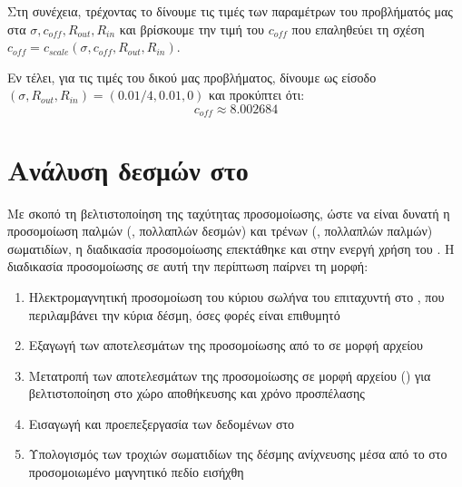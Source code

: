 Στη συνέχεια, τρέχοντας το   δίνουμε τις τιμές των παραμέτρων του προβλήματός μας στα $\sigma, c_{off}, R_{out}, R_{in}$ και βρίσκουμε την τιμή του $c_{off}$ που επαληθεύει τη σχέση $c_{off} = c_{scale} \left(\sigma, c_{off}, R_{out}, R_{in} \right)$.





Εν τέλει, για τις τιμές του δικού μας προβλήματος, δίνουμε ως είσοδο $\left(\sigma, R_{out}, R_{in} \right) = \left(0.01/4,0.01, 0 \right)$ και προκύπτει ότι:
\begin{equation}
c_{off} \approx 8.002684
\end{equation}

\section{Ανάλυση δεσμών στο }

Με σκοπό τη βελτιστοποίηση της ταχύτητας προσομοίωσης, ώστε να είναι δυνατή η προσομοίωση παλμών (, πολλαπλών δεσμών) και τρένων (, πολλαπλών παλμών) σωματιδίων, η διαδικασία προσομοίωσης επεκτάθηκε και στην ενεργή χρήση του .
Η διαδικασία προσομοίωσης σε αυτή την περίπτωση παίρνει τη μορφή:
\begin{enumerate}
\item Ηλεκτρομαγνητική προσομοίωση του κύριου σωλήνα του επιταχυντή στο , που περιλαμβάνει την κύρια δέσμη, όσες φορές είναι επιθυμητό
\item Εξαγωγή των αποτελεσμάτων της προσομοίωσης από το  σε μορφή αρχείου 
\item Μετατροπή των αποτελεσμάτων της προσομοίωσης σε μορφή αρχείου  () για βελτιστοποίηση στο χώρο αποθήκευσης και χρόνο προσπέλασης
\item Εισαγωγή και προεπεξεργασία των δεδομένων στο 
\item Υπολογισμός των τροχιών σωματιδίων της δέσμης ανίχνευσης μέσα από το  στο προσομοιωμένο μαγνητικό πεδίο εισήχθη
\end{enumerate}

